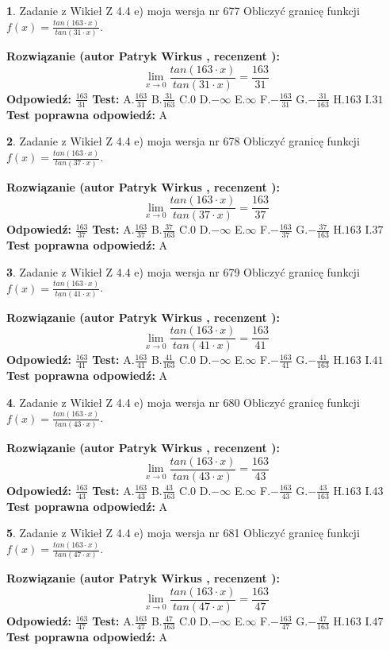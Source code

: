 \documentclass[12pt, a4paper]{article}
\theoremstyle{definition} %
\newtheorem{zad}{}
\newcommand{\zadStart}[1]{\begin{zad}#1\newline}
\newcommand{\zadStop}{\end{zad}}
\newcommand{\rozwStart}[2]{\noindent \textbf{Rozwiązanie (autor #1 , recenzent #2): }\newline}
\newcommand{\rozwStop}{\newline}
\newcommand{\odpStart}{\noindent \textbf{Odpowiedź:}\newline}
\newcommand{\odpStop}{\newline}
\newcommand{\testStart}{\noindent \textbf{Test:}\newline}
\newcommand{\testStop}{\newline}
\newcommand{\kluczStart}{\noindent \textbf{Test poprawna odpowiedź:}\newline}
\newcommand{\kluczStop}{\newline}
\begin{document}
\zadStart{Zadanie z Wikieł Z 4.4 e) moja wersja nr 677}
Obliczyć granicę funkcji $f(x)=\frac{tan(163\cdot x)}{tan(31\cdot x)}$.
\zadStop
\rozwStart{Patryk Wirkus}{}
$$\lim\limits_{x\to 0}\frac{tan(163\cdot x)}{tan(31\cdot x)}=
\frac{163}{31}$$
\rozwStop
\odpStart
$\frac{163}{31}$
\odpStop
\testStart
A.$\frac{163}{31}$
B.$\frac{31}{163}$
C.$0$
D.$-\infty$
E.$\infty$
F.$-\frac{163}{31}$
G.$-\frac{31}{163}$
H.$163$
I.$31$
\testStop
\kluczStart
A
\kluczStop



\zadStart{Zadanie z Wikieł Z 4.4 e) moja wersja nr 678}
Obliczyć granicę funkcji $f(x)=\frac{tan(163\cdot x)}{tan(37\cdot x)}$.
\zadStop
\rozwStart{Patryk Wirkus}{}
$$\lim\limits_{x\to 0}\frac{tan(163\cdot x)}{tan(37\cdot x)}=
\frac{163}{37}$$
\rozwStop
\odpStart
$\frac{163}{37}$
\odpStop
\testStart
A.$\frac{163}{37}$
B.$\frac{37}{163}$
C.$0$
D.$-\infty$
E.$\infty$
F.$-\frac{163}{37}$
G.$-\frac{37}{163}$
H.$163$
I.$37$
\testStop
\kluczStart
A
\kluczStop



\zadStart{Zadanie z Wikieł Z 4.4 e) moja wersja nr 679}
Obliczyć granicę funkcji $f(x)=\frac{tan(163\cdot x)}{tan(41\cdot x)}$.
\zadStop
\rozwStart{Patryk Wirkus}{}
$$\lim\limits_{x\to 0}\frac{tan(163\cdot x)}{tan(41\cdot x)}=
\frac{163}{41}$$
\rozwStop
\odpStart
$\frac{163}{41}$
\odpStop
\testStart
A.$\frac{163}{41}$
B.$\frac{41}{163}$
C.$0$
D.$-\infty$
E.$\infty$
F.$-\frac{163}{41}$
G.$-\frac{41}{163}$
H.$163$
I.$41$
\testStop
\kluczStart
A
\kluczStop



\zadStart{Zadanie z Wikieł Z 4.4 e) moja wersja nr 680}
Obliczyć granicę funkcji $f(x)=\frac{tan(163\cdot x)}{tan(43\cdot x)}$.
\zadStop
\rozwStart{Patryk Wirkus}{}
$$\lim\limits_{x\to 0}\frac{tan(163\cdot x)}{tan(43\cdot x)}=
\frac{163}{43}$$
\rozwStop
\odpStart
$\frac{163}{43}$
\odpStop
\testStart
A.$\frac{163}{43}$
B.$\frac{43}{163}$
C.$0$
D.$-\infty$
E.$\infty$
F.$-\frac{163}{43}$
G.$-\frac{43}{163}$
H.$163$
I.$43$
\testStop
\kluczStart
A
\kluczStop



\zadStart{Zadanie z Wikieł Z 4.4 e) moja wersja nr 681}
Obliczyć granicę funkcji $f(x)=\frac{tan(163\cdot x)}{tan(47\cdot x)}$.
\zadStop
\rozwStart{Patryk Wirkus}{}
$$\lim\limits_{x\to 0}\frac{tan(163\cdot x)}{tan(47\cdot x)}=
\frac{163}{47}$$
\rozwStop
\odpStart
$\frac{163}{47}$
\odpStop
\testStart
A.$\frac{163}{47}$
B.$\frac{47}{163}$
C.$0$
D.$-\infty$
E.$\infty$
F.$-\frac{163}{47}$
G.$-\frac{47}{163}$
H.$163$
I.$47$
\testStop
\kluczStart
A
\kluczStop
\end{document}
